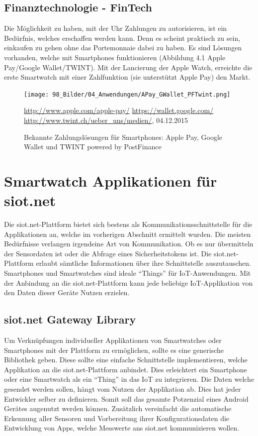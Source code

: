\subsection{Finanztechnologie - FinTech}
Die Möglichkeit zu haben, mit der Uhr Zahlungen zu autorisieren, ist ein Bedürfnis, welches erschaffen werden kann. Denn es scheint praktisch zu sein, einkaufen zu gehen ohne das Portemonnaie dabei zu haben. Es sind Lösungen vorhanden, welche mit Smartphones funktionieren {(Abbildung 4.1 Apple Pay/Google Wallet/TWINT)}. Mit der Lancierung der Apple Watch, erreichte die erste Smartwatch mit einer Zahlfunktion (sie unterstützt Apple Pay) den Markt.
\begin{figure}[H]
  \centering
  \texttt{[image: 98\_Bilder/04\_Anwendungen/APay\_GWallet\_PFTwint.png]}
  \caption[Mobile Zahlungslösungen: Apple Pay, Google Wallet und TWINT powered by PostFinance]{Bekannte Zahlungslösungen für Smartphones: Apple Pay, Google Wallet und TWINT powered by PostFinance}
  \footnotesize \url{http://www.apple.com/apple-pay/} \url{https://wallet.google.com/} \url{http://www.twint.ch/ueber_uns/medien/}, 04.12.2015
\end{figure}

\section{Smartwatch Applikationen für siot.net}
Die siot.net-Plattform bietet sich bestens als Kommunikationsschnittstelle für die Applikationen an, welche im vorherigen Abschnitt ermittelt wurden. Die meisten Bedürfnisse verlangen irgendeine Art von Kommunikation. Ob es nur übermitteln der Sensordaten ist oder die Abfrage eines Sicherheitstokens ist. Die siot.net-Plattform erlaubt sämtliche Informationen über ihre Schnittstelle auszutauschen. Smartphones und Smartwatches sind ideale "`Things"' für \gls{IoT}-Anwendungen. Mit der Anbindung an die siot.net-Plattform kann jede beliebige \gls{IoT}-Applikation von den Daten dieser Geräte Nutzen erzielen.

\subsection{siot.net Gateway Library}
Um Verknüpfungen individueller Applikationen von Smartwatches oder Smartphones mit der Plattform zu ermöglichen, sollte es eine generische Bibliothek geben.
Diese sollte eine einfache Schnittstelle implementieren, welche Applikation an die siot.net-Plattform anbindet. Dies erleichtert ein Smartphone oder eine Smartwatch als ein "`Thing"' in das \gls{IoT} zu integrieren. Die Daten welche gesendet werden sollen, hängt vom Nutzen der Applikation ab. Dies hat jeder Entwickler selber zu definieren. Somit soll das gesamte Potzenzial eines Android Gerätes augenutzt werden können.
Zusätzlich vereinfacht die automatische Erkennung aller Sensoren und Vorbereitung ihrer Konfigurationsdaten die Entwicklung von Apps, welche Messwerte ans siot.net kommunizieren wollen.

